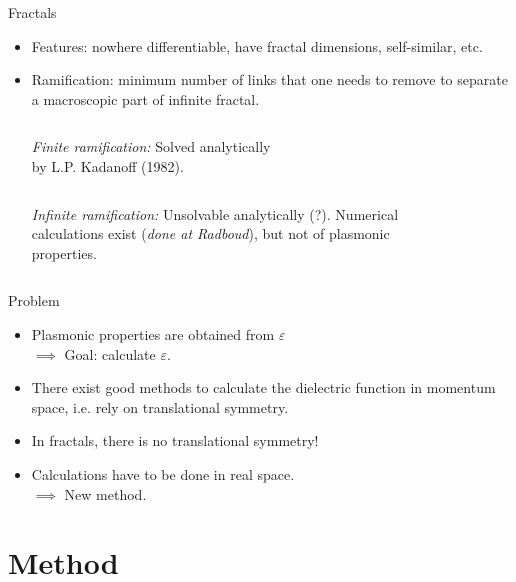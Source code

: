 \documentclass{beamer}
\begin{document}
\begin{frame}{Fractals}
    \begin{itemize}
    \item Features: nowhere differentiable, have fractal dimensions, self-similar, etc.
    \item Ramification: minimum number of links that one needs to remove to separate a macroscopic part of infinite fractal.
        \begin{columns}[T]
            \emph{Finite ramification:} \alert{Solved analytically} \\ by L.P. Kadanoff (1982).
            \begin{figure}
            
            \end{figure}
        \end{columns}

        \begin{columns}[T]
            \emph{Infinite ramification:} \alert{Unsolvable analytically} (?). Numerical calculations exist (\emph{done at Radboud}), but not of plasmonic properties.
            \begin{figure}
            
            \end{figure}
        \end{columns}
    \end{itemize}
\end{frame}

\begin{frame}{Problem}
    \begin{itemize}
    \item Plasmonic properties are obtained from $\varepsilon$ \\
        $\implies$ \alert{Goal}: calculate $\varepsilon$.
    \item There exist good methods to calculate the dielectric function in \alert{momentum space}, i.e. rely on translational symmetry.
    \item In fractals, there is \alert{no translational symmetry}!
    \item Calculations have to be done in \alert{real space}. \\
        $\implies$ \alert{New method}.
    \end{itemize}
\end{frame}

\section{Method}
\end{document}
